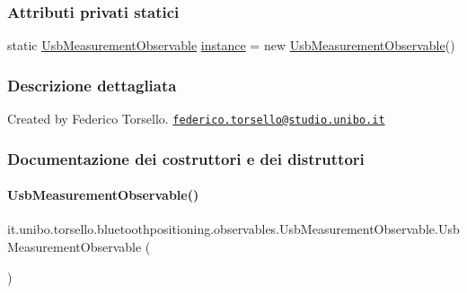\subsubsection*{Attributi privati statici}
\begin{DoxyCompactItemize}
\item 
static \hyperlink{classit_1_1unibo_1_1torsello_1_1bluetoothpositioning_1_1observables_1_1UsbMeasurementObservable}{Usb\+Measurement\+Observable} \hyperlink{classit_1_1unibo_1_1torsello_1_1bluetoothpositioning_1_1observables_1_1UsbMeasurementObservable_a19cb655efdf8656403f342caca294e62_a19cb655efdf8656403f342caca294e62}{instance} = new \hyperlink{classit_1_1unibo_1_1torsello_1_1bluetoothpositioning_1_1observables_1_1UsbMeasurementObservable}{Usb\+Measurement\+Observable}()
\end{DoxyCompactItemize}


\subsubsection{Descrizione dettagliata}
Created by Federico Torsello. \href{mailto:federico.torsello@studio.unibo.it}{\tt federico.\+torsello@studio.\+unibo.\+it} 

\subsubsection{Documentazione dei costruttori e dei distruttori}
\hypertarget{classit_1_1unibo_1_1torsello_1_1bluetoothpositioning_1_1observables_1_1UsbMeasurementObservable_acd610e92f8d8dc3bcf9ff7543c2ff21a_acd610e92f8d8dc3bcf9ff7543c2ff21a}{}\label{classit_1_1unibo_1_1torsello_1_1bluetoothpositioning_1_1observables_1_1UsbMeasurementObservable_acd610e92f8d8dc3bcf9ff7543c2ff21a_acd610e92f8d8dc3bcf9ff7543c2ff21a} 
\paragraph{\texorpdfstring{Usb\+Measurement\+Observable()}{UsbMeasurementObservable()}}
{\footnotesize\ttfamily it.\+unibo.\+torsello.\+bluetoothpositioning.\+observables.\+Usb\+Measurement\+Observable.\+Usb\+Measurement\+Observable (\begin{DoxyParamCaption}{ }\end{DoxyParamCaption})\hspace{0.3cm}{\ttfamily [private]}}


